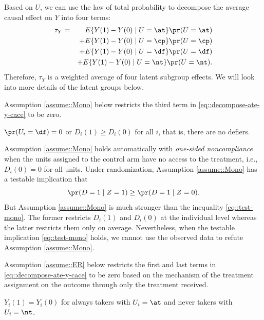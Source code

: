 Based on $U$, we can use the law of total probability to decompose the average causal effect on $Y$ into four terms:
\begin{eqnarray} 
\tau_Y &=& E\{ Y(1) - Y(0) \mid U=\at  \} \pr(U = \at )  \nonumber  \\
&&+ E\{ Y(1) - Y(0) \mid U=\cp   \} \pr(U = \cp ) \nonumber  \\
&&+ E\{ Y(1) - Y(0) \mid U=\df  \} \pr(U = \df ) \nonumber  \\
&&+ E\{ Y(1) - Y(0) \mid U=\nt  \} \pr(U = \nt ) . \label{eq::decompose-ate-y-cace}
\end{eqnarray}  
Therefore, $\tau_Y $ is a weighted average of four latent subgroup effects. We will look into more details of the latent groups below. 



Assumption \ref{assume::Mono} below restricts the third term in \eqref{eq::decompose-ate-y-cace} to be zero. 
\begin{assumption}[monotonicity]
\label{assume::Mono}
$\pr(U_i = \df) = 0$ or $D_i(1)\geq D_i(0)$ for all $i$, that is, there are no defiers. 
\end{assumption}

Assumption \ref{assume::Mono} holds automatically with {\it one-sided noncompliance} when the units assigned to the control arm have no access to the treatment, i.e., $D_i(0) = 0$ for all units. Under randomization, Assumption \ref{assume::Mono} has a testable implication that 
\begin{equation}
\label{eq::test-mono}
\pr(D=1\mid Z=1) \geq \pr(D=1\mid Z=0).
\end{equation}
But Assumption \ref{assume::Mono} is much stronger than the inequality \eqref{eq::test-mono}. The former restricts $D_i(1)$ and $D_i(0)$ at the individual level whereas the latter restricts them only on average. Nevertheless, when the testable implication \eqref{eq::test-mono} holds, we cannot use the observed data to refute Assumption \ref{assume::Mono}. 


Assumption \ref{assume::ER} below restricts the first and last terms in \eqref{eq::decompose-ate-y-cace} to be zero based on the mechanism of the treatment assignment on the outcome through only the treatment received. 
\begin{assumption}
\label{assume::ER}
$Y_i(1) = Y_i(0)$ for always takers with $U_i=\at$ and never takers with $U_i = \nt$. 
\end{assumption}


